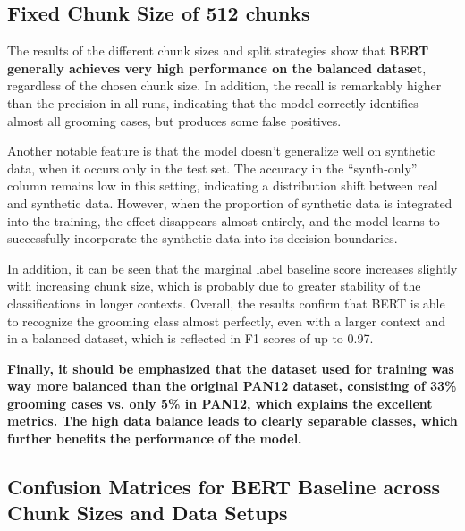 \subsection{Fixed Chunk Size of 512 chunks}



The results of the different chunk sizes and split strategies show that \textbf{BERT generally achieves very high performance on the balanced dataset}, regardless of the chosen chunk size. In addition, the recall is remarkably higher than the precision in all runs, indicating that the model correctly identifies almost all grooming cases, but produces some false positives. 

Another notable feature is that the model doesn't generalize well on synthetic data, when it occurs only in the test set. The accuracy in the “synth-only” column remains low in this setting, indicating a distribution shift between real and synthetic data. However, when the proportion of synthetic data is integrated into the training, the effect disappears almost entirely, and the model learns to successfully incorporate the synthetic data into its decision boundaries.

In addition, it can be seen that the marginal label baseline score increases slightly with increasing chunk size, which is probably due to greater stability of the classifications in longer contexts. Overall, the results confirm that BERT is able to recognize the grooming class almost perfectly, even with a larger context and in a balanced dataset, which is reflected in F1 scores of up to 0.97.

\textbf{Finally, it should be emphasized that the dataset used for training was way more balanced than the original PAN12 dataset, consisting of 33\% grooming cases vs. only 5\% in PAN12, which explains the excellent metrics. The high data balance leads to clearly separable classes, which further benefits the performance of the model.}



\subsection{Confusion Matrices for BERT Baseline across Chunk Sizes and Data Setups}

